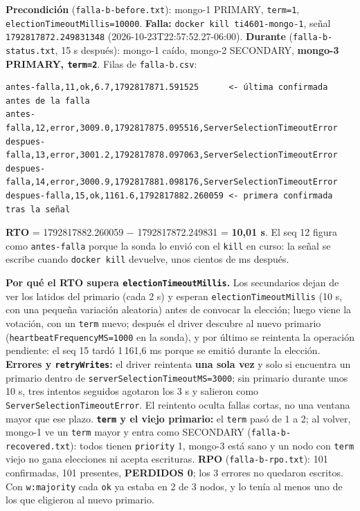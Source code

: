 \documentclass[10pt,letterpaper]{article}
\begin{document}
\textbf{Precondición} (\texttt{falla-b-before.txt}): mongo-1 PRIMARY, \texttt{term=1},
\texttt{electionTimeoutMillis=10000}. \textbf{Falla:} \texttt{docker kill ti4601-mongo-1}, señal
\texttt{1792817872.249831348} (2026-10-23T22:57:52.27-06:00). \textbf{Durante}
(\texttt{falla-b-status.txt}, 15 s después): mongo-1 caído, mongo-2 SECONDARY, \textbf{mongo-3 PRIMARY,
\texttt{term=2}}. Filas de \texttt{falla-b.csv}:
\begin{Verbatim}
antes-falla,11,ok,6.7,1792817871.591525      <- última confirmada antes de la falla
antes-falla,12,error,3009.0,1792817875.095516,ServerSelectionTimeoutError
despues-falla,13,error,3001.2,1792817878.097063,ServerSelectionTimeoutError
despues-falla,14,error,3000.9,1792817881.098176,ServerSelectionTimeoutError
despues-falla,15,ok,1161.6,1792817882.260059 <- primera confirmada tras la señal
\end{Verbatim}
\textbf{RTO} = 1792817882.260059 $-$ 1792817872.249831 = \textbf{10,01 s}. El seq 12 figura como
\texttt{antes-falla} porque la sonda lo envió con el \texttt{kill} en curso: la señal se escribe cuando
\texttt{docker kill} devuelve, unos cientos de ms después.

\textbf{Por qué el RTO supera \texttt{electionTimeoutMillis}.} Los secundarios dejan de ver los latidos
del primario (cada 2 s) y esperan \texttt{electionTimeoutMillis} (10 s, con una pequeña variación
aleatoria) antes de convocar la elección; luego viene la votación, con un \texttt{term} nuevo; después el
driver descubre al nuevo primario (\texttt{heartbeatFrequencyMS=1000} en la sonda), y por último se
reintenta la operación pendiente: el seq 15 tardó 1\,161,6 ms porque se emitió durante la elección.
\textbf{Errores y \texttt{retryWrites}:} el driver reintenta \textbf{una sola vez} y solo si encuentra un
primario dentro de \texttt{serverSelectionTimeoutMS=3000}; sin primario durante unos 10 s, tres intentos
seguidos agotaron los 3 s y salieron como \texttt{ServerSelectionTimeoutError}. El reintento oculta fallas
cortas, no una ventana mayor que ese plazo. \textbf{\texttt{term} y el viejo primario:} el \texttt{term} pasó
de 1 a 2; al volver, mongo-1 ve un \texttt{term} mayor y entra como SECONDARY
(\texttt{falla-b-recovered.txt}): todos tienen \texttt{priority} 1, mongo-3 está sano y un nodo con
\texttt{term} viejo no gana elecciones ni acepta escrituras. \textbf{RPO} (\texttt{falla-b-rpo.txt}): 101
confirmadas, 101 presentes, \textbf{PERDIDOS 0}; los 3 errores no quedaron escritos. Con
\texttt{w:majority} cada \texttt{ok} ya estaba en 2 de 3 nodos, y lo tenía al menos uno de los que eligieron
al nuevo primario.
\end{document}
